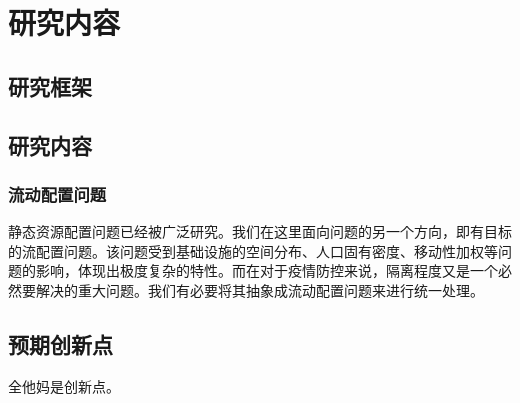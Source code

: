 \chapter{研究内容}

\section{研究框架}


\section{研究内容}

\subsection{流动配置问题}

静态资源配置问题已经被广泛研究。我们在这里面向问题的另一个方向，即有目标的流配置问题。该问题受到基础设施的空间分布、人口固有密度、移动性加权等问题的影响，体现出极度复杂的特性。而在对于疫情防控来说，隔离程度又是一个必然要解决的重大问题。我们有必要将其抽象成流动配置问题来进行统一处理。

\section{预期创新点}
全他妈是创新点。